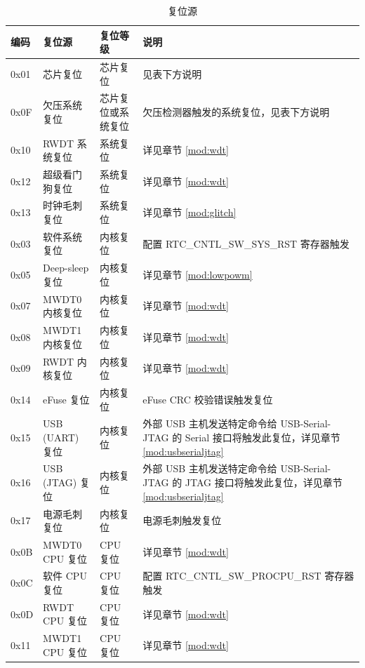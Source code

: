 \documentclass[main\_\_CN.tex]{subfiles}
\begin{document}
\begin{table}[H]
    \centering
    \caption{复位源}
    \label{tab:resclk-reset-src}
    \begin{threeparttable}
    \begin{tabular}{ |l|m{3.5cm}|m{1.8cm}|m{9.2cm}| }
    \hline
\rowcolor{lightgray}
\textbf{编码} & \textbf{复位源} & \textbf{复位等级} &   \textbf{说明} \\\hline
        0x01 & 芯片复位 & 芯片复位 &  见表下方说明\tnote{1}\\
        \hline
        0x0F & 欠压系统复位 & 芯片复位或系统复位 & 欠压检测器触发的系统复位，见表下方说明\tnote{2}\\
        \hline
        0x10 & RWDT 系统复位 & 系统复位 & 详见章节 \ref{mod:wdt} \textit{\nameref{mod:wdt}}
        \\\hline
        0x12 & 超级看门狗复位 & 系统复位 & 详见章节 \ref{mod:wdt} \textit{\nameref{mod:wdt}}
        \\\hline
        0x13 & 时钟毛刺复位 & 系统复位 & 详见章节 \ref{mod:glitch} \textit{\nameref{mod:glitch}}
        \\\hline
        0x03 & 软件系统复位 & 内核复位 & 配置 RTC\_CNTL\_SW\_SYS\_RST 寄存器触发\\
        \hline
        0x05 & Deep-sleep 复位 & 内核复位 & 详见章节 \ref{mod:lowpowm} \textit{\nameref{mod:lowpowm}}
        \\\hline
        0x07 & MWDT0 内核复位 & 内核复位 & 详见章节 \ref{mod:wdt} \textit{\nameref{mod:wdt}}
        \\\hline
        0x08 & MWDT1 内核复位 & 内核复位 & 详见章节 \ref{mod:wdt} \textit{\nameref{mod:wdt}}
        \\\hline
        0x09 & RWDT 内核复位 & 内核复位 & 详见章节 \ref{mod:wdt} \textit{\nameref{mod:wdt}}
        \\\hline
        0x14 & eFuse 复位 & 内核复位 & eFuse CRC 校验错误触发复位
        \\\hline
        0x15 & USB (UART) 复位 & 内核复位 & 外部 USB 主机发送特定命令给 USB-Serial-JTAG 的 Serial 接口将触发此复位，详见章节 \ref{mod:usbserialjtag} \textit{\nameref{mod:usbserialjtag}} \\\hline
        0x16 & USB (JTAG) 复位 & 内核复位 & 外部 USB 主机发送特定命令给 USB-Serial-JTAG 的 JTAG 接口将触发此复位，详见章节 \ref{mod:usbserialjtag} \textit{\nameref{mod:usbserialjtag}} \\\hline
        0x17 & 电源毛刺复位 & 内核复位 & 电源毛刺触发复位
        \\\hline
        0x0B & MWDT0 CPU 复位 & CPU 复位 & 详见章节 \ref{mod:wdt} \textit{\nameref{mod:wdt}}
        \\\hline
         0x0C & 软件 CPU 复位 & CPU 复位 & 配置 RTC\_CNTL\_SW\_PROCPU\_RST 寄存器触发\\
        \hline
        0x0D & RWDT CPU 复位 & CPU 复位 & 详见章节 \ref{mod:wdt} \textit{\nameref{mod:wdt}}
        \\\hline
        0x11 & MWDT1 CPU 复位 & CPU 复位 & 详见章节 \ref{mod:wdt} \textit{\nameref{mod:wdt}}
        \\\hline
\end{tabular}


\end{threeparttable}
\end{table}
\end{document}
